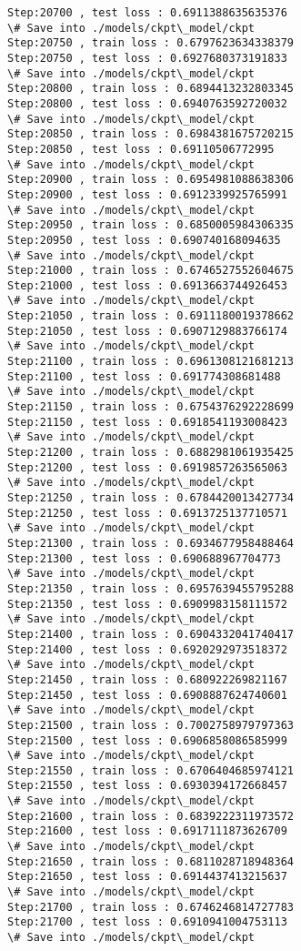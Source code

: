 \documentclass[11pt]{article}
\begin{document}
\begin{Verbatim}[commandchars=\\\{\}]
Step:20700 , test loss : 0.6911388635635376
\# Save into ./models/ckpt\_model/ckpt
Step:20750 , train loss : 0.6797623634338379
Step:20750 , test loss : 0.6927680373191833
\# Save into ./models/ckpt\_model/ckpt
Step:20800 , train loss : 0.6894413232803345
Step:20800 , test loss : 0.6940763592720032
\# Save into ./models/ckpt\_model/ckpt
Step:20850 , train loss : 0.6984381675720215
Step:20850 , test loss : 0.69110506772995
\# Save into ./models/ckpt\_model/ckpt
Step:20900 , train loss : 0.6954981088638306
Step:20900 , test loss : 0.6912339925765991
\# Save into ./models/ckpt\_model/ckpt
Step:20950 , train loss : 0.6850005984306335
Step:20950 , test loss : 0.690740168094635
\# Save into ./models/ckpt\_model/ckpt
Step:21000 , train loss : 0.6746527552604675
Step:21000 , test loss : 0.6913663744926453
\# Save into ./models/ckpt\_model/ckpt
Step:21050 , train loss : 0.6911180019378662
Step:21050 , test loss : 0.6907129883766174
\# Save into ./models/ckpt\_model/ckpt
Step:21100 , train loss : 0.6961308121681213
Step:21100 , test loss : 0.691774308681488
\# Save into ./models/ckpt\_model/ckpt
Step:21150 , train loss : 0.6754376292228699
Step:21150 , test loss : 0.6918541193008423
\# Save into ./models/ckpt\_model/ckpt
Step:21200 , train loss : 0.6882981061935425
Step:21200 , test loss : 0.6919857263565063
\# Save into ./models/ckpt\_model/ckpt
Step:21250 , train loss : 0.6784420013427734
Step:21250 , test loss : 0.6913725137710571
\# Save into ./models/ckpt\_model/ckpt
Step:21300 , train loss : 0.6934677958488464
Step:21300 , test loss : 0.690688967704773
\# Save into ./models/ckpt\_model/ckpt
Step:21350 , train loss : 0.6957639455795288
Step:21350 , test loss : 0.6909983158111572
\# Save into ./models/ckpt\_model/ckpt
Step:21400 , train loss : 0.6904332041740417
Step:21400 , test loss : 0.6920292973518372
\# Save into ./models/ckpt\_model/ckpt
Step:21450 , train loss : 0.680922269821167
Step:21450 , test loss : 0.6908887624740601
\# Save into ./models/ckpt\_model/ckpt
Step:21500 , train loss : 0.7002758979797363
Step:21500 , test loss : 0.6906858086585999
\# Save into ./models/ckpt\_model/ckpt
Step:21550 , train loss : 0.6706404685974121
Step:21550 , test loss : 0.6930394172668457
\# Save into ./models/ckpt\_model/ckpt
Step:21600 , train loss : 0.6839222311973572
Step:21600 , test loss : 0.6917111873626709
\# Save into ./models/ckpt\_model/ckpt
Step:21650 , train loss : 0.6811028718948364
Step:21650 , test loss : 0.6914437413215637
\# Save into ./models/ckpt\_model/ckpt
Step:21700 , train loss : 0.6746246814727783
Step:21700 , test loss : 0.6910941004753113
\# Save into ./models/ckpt\_model/ckpt

\end{Verbatim}
\end{document}
